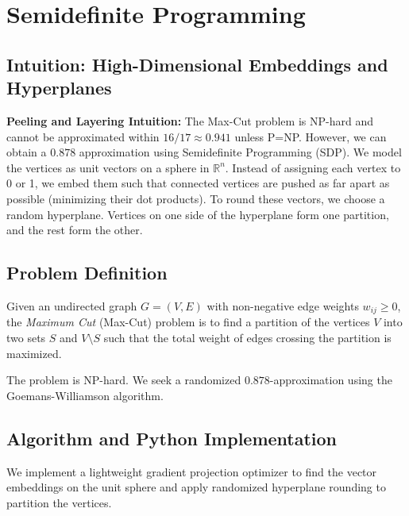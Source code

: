 \documentclass[11pt,oneside]{book}
\begin{document}
\setcounter{chapter}{17}
\chapter{Semidefinite Programming}
\label{ch:sdp_maxcut}

\section{Intuition: High-Dimensional Embeddings and Hyperplanes}

\begin{intuitionbox}
\textbf{Peeling and Layering Intuition:} The Max-Cut problem is NP-hard and cannot be approximated within $16/17 \approx 0.941$ unless P=NP. However, we can obtain a $0.878$ approximation using Semidefinite Programming (SDP). We model the vertices as unit vectors on a sphere in $\mathbb{R}^n$. Instead of assigning each vertex to 0 or 1, we embed them such that connected vertices are pushed as far apart as possible (minimizing their dot products). To round these vectors, we choose a random hyperplane. Vertices on one side of the hyperplane form one partition, and the rest form the other.
\end{intuitionbox}

\section{Problem Definition}
Given an undirected graph $G = (V, E)$ with non-negative edge weights $w_{ij} \ge 0$, the \emph{Maximum Cut} (Max-Cut) problem is to find a partition of the vertices $V$ into two sets $S$ and $V \setminus S$ such that the total weight of edges crossing the partition is maximized.

The problem is NP-hard. We seek a randomized $0.878$-approximation using the Goemans-Williamson algorithm.

\section{Algorithm and Python Implementation}
We implement a lightweight gradient projection optimizer to find the vector embeddings on the unit sphere and apply randomized hyperplane rounding to partition the vertices.
\end{document}

